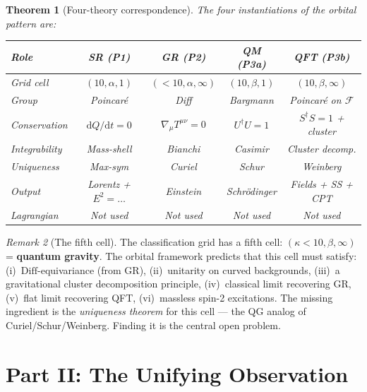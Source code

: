 \documentclass[12pt]{article}
\theoremstyle{plain}
\newtheorem{theorem}{Theorem}[section]
\theoremstyle{definition}
\theoremstyle{remark}
\newtheorem{remark}[theorem]{Remark}
\newcommand{\Diff}{\mathrm{Diff}}
\newcommand{\dd}{\mathrm{d}}
\begin{document}
\begin{theorem}[Four-theory correspondence]\label{thm:grand-table}
The four instantiations of the orbital pattern are:

\begin{center}\footnotesize
\begin{tabular}{lcccc}\toprule
\textbf{Role} & \textbf{SR (P1)} & \textbf{GR (P2)} & \textbf{QM (P3a)} & \textbf{QFT (P3b)} \\\midrule
Grid cell & $(10, \alpha, 1)$ & $(<\!10, \alpha, \infty)$ & $(10, \beta, 1)$ & $(10, \beta, \infty)$ \\
Group & Poincar\'e & Diff & Bargmann & Poincar\'e on $\mathcal{F}$ \\
Conservation & $\dd Q/\dd t = 0$ & $\nabla_\mu T^{\mu\nu} = 0$ & $U^\dagger U = 1$ & $S^\dagger S = 1$ + cluster \\
Integrability & Mass-shell & Bianchi & Casimir & Cluster decomp. \\
Uniqueness & Max-sym & Curiel & Schur & Weinberg \\
Output & Lorentz + $E^2\!=\!\ldots$ & Einstein & Schr\"odinger & Fields + SS + CPT \\
Lagrangian & Not used & Not used & Not used & Not used \\
\bottomrule
\end{tabular}
\end{center}
\end{theorem}

\begin{remark}[The fifth cell]
The classification grid has a fifth cell: $(\kappa < 10, \beta, \infty)$ = \textbf{quantum gravity}. The orbital framework predicts that this cell must satisfy: (i)~$\Diff$-equivariance (from GR), (ii)~unitarity on curved backgrounds, (iii)~a gravitational cluster decomposition principle, (iv)~classical limit recovering GR, (v)~flat limit recovering QFT, (vi)~massless spin-2 excitations. The missing ingredient is the \emph{uniqueness theorem} for this cell --- the QG analog of Curiel/Schur/Weinberg. Finding it is the central open problem.
\end{remark}





\part*{Part II: The Unifying Observation}
\end{document}
